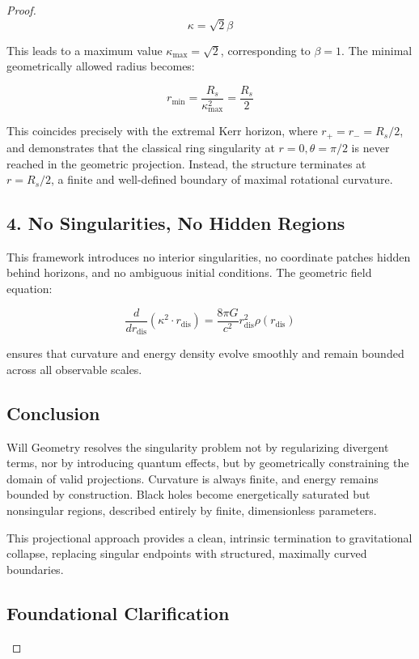 \documentclass{article}
\begin{document}
\begin{theorem}
\begin{proof}
\[
\kappa = \sqrt{2} \beta
\]

This leads to a maximum value \( \kappa_{\text{max}} = \sqrt{2} \), corresponding to \( \beta = 1 \). The minimal geometrically allowed radius becomes:

\[
r_{\text{min}} = \frac{R_s}{\kappa_{\text{max}}^2} = \frac{R_s}{2}
\]

This coincides precisely with the extremal Kerr horizon, where \( r_+ = r_- = R_s / 2 \), and demonstrates that the classical ring singularity at \( r = 0, \theta = \pi/2 \) is never reached in the geometric projection. Instead, the structure terminates at \( r = R_s / 2 \), a finite and well-defined boundary of maximal rotational curvature.

\subsection*{4. No Singularities, No Hidden Regions}

This framework introduces no interior singularities, no coordinate patches hidden behind horizons, and no ambiguous initial conditions. The geometric field equation:

\[
\frac{d}{dr_{\text{dis}}}(\kappa^2 \cdot r_{\text{dis}}) = \frac{8\pi G}{c^2} r_{\text{dis}}^2 \rho(r_{\text{dis}})
\]

ensures that curvature and energy density evolve smoothly and remain bounded across all observable scales.

\subsection*{Conclusion}

Will Geometry resolves the singularity problem not by regularizing divergent terms, nor by introducing quantum effects, but by geometrically constraining the domain of valid projections. Curvature is always finite, and energy remains bounded by construction. Black holes become energetically saturated but nonsingular regions, described entirely by finite, dimensionless parameters.

This projectional approach provides a clean, intrinsic termination to gravitational collapse, replacing singular endpoints with structured, maximally curved boundaries.

\subsection*{Foundational Clarification}


\end{proof}
\end{theorem}
\end{document}
